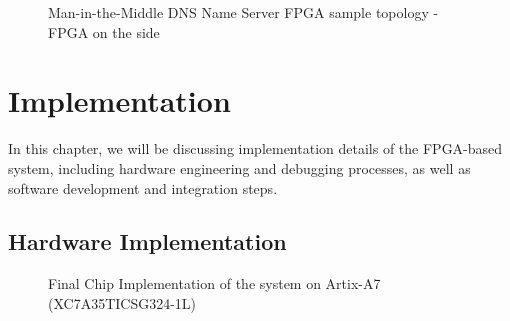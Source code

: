 \documentclass[a4paper]{report}
\begin{document}
\begin{figure}[H]
  \caption{Man-in-the-Middle DNS Name Server FPGA sample topology - FPGA on the side}
  \label{fig:dns-flood-man-in-the-middle-asic}
\end{figure}

\chapter{Implementation}

In this chapter, we will be discussing implementation details of the FPGA-based system, including hardware engineering and debugging processes, as well as software development and integration steps.

\section{Hardware Implementation}
\label{section:implementation-hardware-implementation}

\begin{figure}[H]
  \caption{Final Chip Implementation of the system on Artix-A7 (XC7A35TICSG324-1L)}
  \label{fig:on-chip-impl}
\end{figure}
\end{document}
